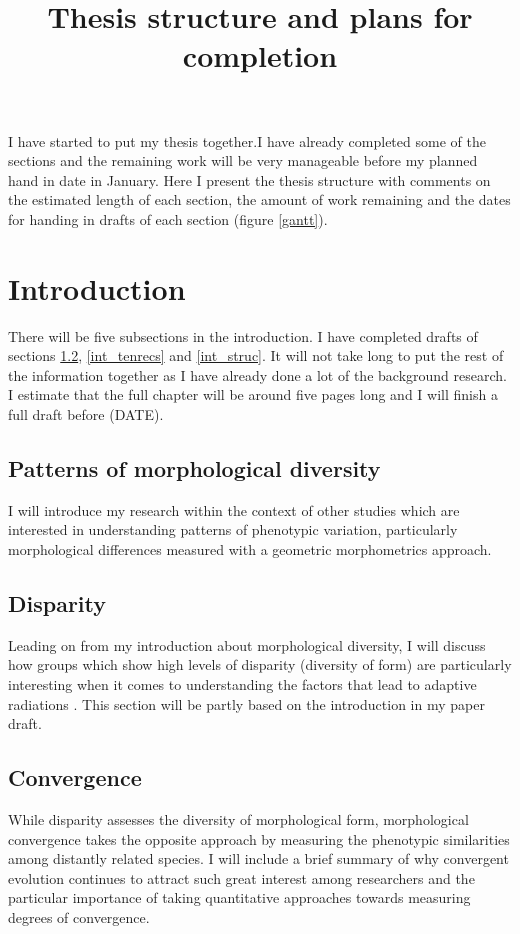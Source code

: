\documentclass[12pt,a4paper]{article}
\begin{document}
\title{Thesis structure and plans for completion}
\author{}
\date{}
\maketitle


	I have started to put my thesis together.I have already completed some of the sections and the remaining work will be very manageable before my planned hand in date in January. Here I present the thesis structure with comments on the estimated length of each section, the amount of work remaining and the dates for handing in drafts of each section (figure \ref{gantt}). 

\section{Introduction}
	There will be five subsections in the introduction. I have completed drafts of sections \ref{int_disp}, \ref{int_tenrecs} and \ref*{int_struc}. It will not take long to put the rest of the information together as I have already done a lot of the background research. I estimate that the full chapter will be around five pages long and I will finish a full draft before (DATE).


	\subsection{Patterns of morphological diversity}
		I will introduce my research within the context of other studies which are interested in understanding patterns of phenotypic variation, particularly morphological differences measured with a geometric morphometrics approach. 

	\subsection{Disparity}
		\label{int_disp}
		Leading on from my introduction about morphological diversity, I will discuss how groups which show high levels of disparity (diversity of form) are particularly interesting when it comes to understanding the factors that lead to adaptive radiations \citep{Losos2010a}. This section will be partly based on the introduction in my paper draft.  
		
	\subsection{Convergence}
		\label{int_conv}
		While disparity assesses the diversity of morphological form, morphological convergence takes the opposite approach by measuring the phenotypic similarities among distantly related species. I will include a brief summary of why convergent evolution continues to attract such great interest among researchers and the particular importance of taking quantitative approaches towards measuring degrees of convergence.
	
\end{document}
